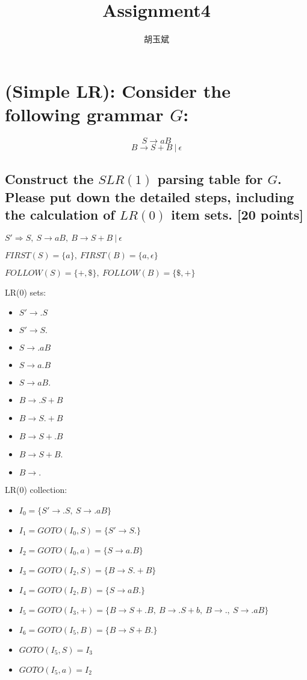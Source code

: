 \documentclass[onecolumn,oneside]{SUSTechHomework}
\author{胡玉斌}
\title{Assignment4}
\begin{document}
  \maketitle

  \section{(Simple LR): Consider the following grammar $G$:}

  $$S \rightarrow aB$$
  $$B \rightarrow S+B~|~\epsilon$$

    \subsection{Construct the $SLR(1)$ parsing table for $G$. Please put down the detailed steps, including
    the calculation of $LR(0)$ item sets. [20 points]}

    $S' \Rightarrow S,~S \rightarrow aB,~B \rightarrow S+B~|~\epsilon$

    $FIRST(S)=\{a\},~FIRST(B)=\{a, \epsilon\}$

    $FOLLOW(S)=\{+, \$\},~FOLLOW(B)=\{\$, +\}$
    
    LR(0) sets:
    \begin{itemize}
      \item $S' \rightarrow .S$
      \item $S' \rightarrow S.$
      \item $S \rightarrow .aB$
      \item $S \rightarrow a.B$
      \item $S \rightarrow aB.$
      \item $B \rightarrow .S+B$
      \item $B \rightarrow S.+B$
      \item $B \rightarrow S+.B$
      \item $B \rightarrow S+B.$
      \item $B \rightarrow .$
    \end{itemize}

    LR(0) collection:
    \begin{itemize}
      \item $I_0 = \{S' \rightarrow .S,~S \rightarrow .aB\}$
      \item $I_1 = GOTO(I_0, S) = \{S' \rightarrow S.\}$
      \item $I_2 = GOTO(I_0, a) = \{S \rightarrow a.B\}$
      \item $I_3 = GOTO(I_2, S) = \{B \rightarrow S. + B\}$
      \item $I_4 = GOTO(I_2, B) = \{S \rightarrow aB.\}$
      \item $I_5 = GOTO(I_3, +) = \{B \rightarrow S+.B,~B \rightarrow .S+b,~B \rightarrow .,~S \rightarrow .aB\}$
      \item $I_6 = GOTO(I_5, B) = \{B \rightarrow S+B.\}$
      \item $GOTO(I_5,S)=I_3$
      \item $GOTO(I_5,a)=I_2$
    \end{itemize}
\end{document}
